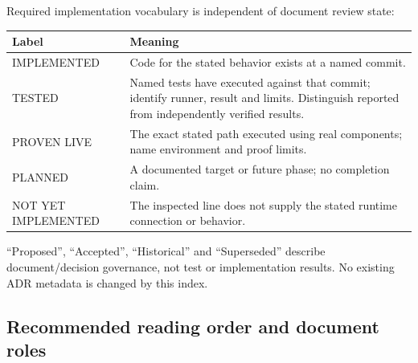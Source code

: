 \documentclass[
  10pt,
]{article}
\begin{document}
Required implementation vocabulary is independent of document review
state:

\begin{longtable}[]{@{}>{\raggedright\arraybackslash}p{}>{\raggedright\arraybackslash}p{}@{}}
\toprule\noalign{}
Label & Meaning \\
\midrule\noalign{}
\endhead
\bottomrule\noalign{}
\endlastfoot
IMPLEMENTED & Code for the stated behavior exists at a named commit. \\
TESTED & Named tests have executed against that commit; identify runner,
result and limits. Distinguish reported from independently verified
results. \\
PROVEN LIVE & The exact stated path executed using real components; name
environment and proof limits. \\
PLANNED & A documented target or future phase; no completion claim. \\
NOT YET IMPLEMENTED & The inspected line does not supply the stated
runtime connection or behavior. \\
\end{longtable}

``Proposed'', ``Accepted'', ``Historical'' and ``Superseded'' describe
document/decision governance, not test or implementation results. No
existing ADR metadata is changed by this index.

\hypertarget{recommended-reading-order-and-document-roles}{%
\subsection{Recommended reading order and document
roles}\label{recommended-reading-order-and-document-roles}}
\end{document}
